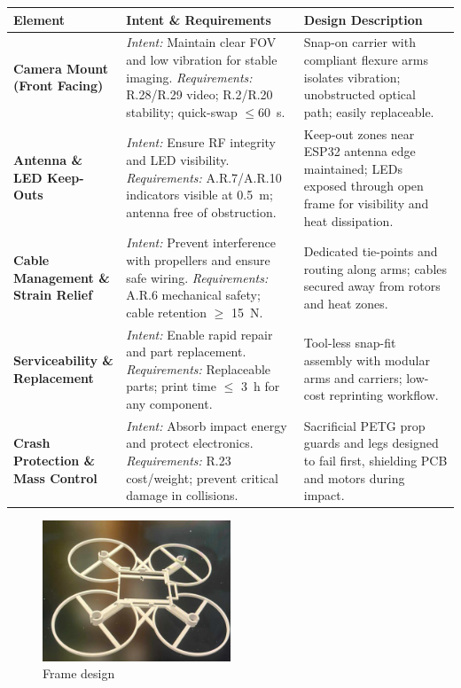 \begin{longtable}{@{}p{3.2cm} p{6.4cm} p{6.4cm}@{}}
\toprule
\textbf{Element} & \textbf{Intent \& Requirements} & \textbf{Design Description} \\ 
\midrule

\textbf{Camera Mount (Front Facing)} &
\textit{Intent:} Maintain clear FOV and low vibration for stable imaging. \newline
\textit{Requirements:} R.28/R.29 video; R.2/R.20 stability; quick-swap $\leq 60$~s. &
Snap-on carrier with compliant flexure arms isolates vibration; unobstructed optical path; easily replaceable. \\ 
\midrule

\textbf{Antenna \& LED Keep-Outs} &
\textit{Intent:} Ensure RF integrity and LED visibility. \newline
\textit{Requirements:} A.R.7/A.R.10 indicators visible at 0.5~m; antenna free of obstruction. &
Keep-out zones near ESP32 antenna edge maintained; LEDs exposed through open frame for visibility and heat dissipation. \\ 
\midrule

\textbf{Cable Management \& Strain Relief} &
\textit{Intent:} Prevent interference with propellers and ensure safe wiring. \newline
\textit{Requirements:} A.R.6 mechanical safety; cable retention $\geq$ 15~N. &
Dedicated tie-points and routing along arms; cables secured away from rotors and heat zones. \\ 
\midrule

\textbf{Serviceability \& Replacement} &
\textit{Intent:} Enable rapid repair and part replacement. \newline
\textit{Requirements:} Replaceable parts; print time $\leq$ 3~h for any component. &
Tool-less snap-fit assembly with modular arms and carriers; low-cost reprinting workflow. \\ 
\midrule

\textbf{Crash Protection \& Mass Control} &
\textit{Intent:} Absorb impact energy and protect electronics. \newline
\textit{Requirements:} R.23 cost/weight; prevent critical damage in collisions. &
Sacrificial PETG prop guards and legs designed to fail first, shielding PCB and motors during impact. \\ 
\bottomrule
\end{longtable}

\begin{figure}[H]
    \centering
    \captionsetup{justification=centering, margin=1cm}
    \includegraphics[width=0.5\textwidth]{img/frame-placeholder.PNG}
    \caption{Frame design }
    \label{fig:pcb-sections}
\end{figure}
